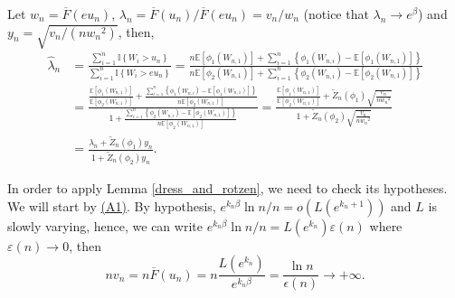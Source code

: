\documentclass[sn-mathphys-ay]{sn-jnl}%
\newcommand{\E}{\mathbb{E}}
\newcommand{\AssumpAOneText}{(A1)}
\newcommand{\AssumpAOne}{\hyperref[assumpt:AssumpAOne]{\AssumpAOneText}}
\begin{document}
\begin{appendices}
Let \(w_n=\overline F \left( {e{u_n}} \right)\), \({\lambda _n} = {{\overline F
        \left( {{u_n}} \right)}}/{{\overline F \left( {e{u_n}} \right)}}={v_n}/{w_n}\)
(notice that \(\lambda_n\to e^\beta\)) and \({y_n} = \sqrt
{{{{v_n}}}/{{(n{w_n}^2)}}}\), then,
\begin{align}
    \widehat{\lambda}_n & =\frac{{\sum\limits_{i = 1}^n {\mathbb{I}\left\{ {{W_i} > u_n} \right\}} }}{{\sum\limits_{i = 1}^n {\mathbb{I}\left\{ {{W_i} > eu_n} \right\}} }} = \frac{{n\E\left[{\phi_1}\left( {{W_{n,1}}} \right)\right] + \sum\limits_{i = 1}^n {\left\{ {{\phi _1}\left( {{W_{n,i}}} \right) - \E\left[{\phi _1}\left( {{W_{n,1}}} \right)\right]} \right\}} }}{{n\E\left[{\phi _2}\left( {{W_{n,1}}} \right)\right] + \sum\limits_{i = 1}^n {\left\{ {{\phi _2}\left( {{W_{n,i}}} \right) - \E\left[{\phi _2}\left( {{W_{n,1}}} \right)\right]} \right\}} }}\nonumber                                                                                                                                                                                                                                                                                                  \\
                        & = \frac{{\frac{{\E\left[{\phi _1}\left( {{W_{n,1}}} \right)\right]}}{{\E\left[{\phi _2}\left( {{W_{n,1}}} \right)\right]}} + \frac{{\sum\limits_{i = 1}^n {\left\{ {{\phi _1}\left( {{W_{n,i}}} \right) - \E\left[{\phi _1}\left( {{W_{n,1}}} \right)\right]} \right\}} }}{{n\E\left[{\phi _2}\left( {{W_{n,1}}} \right)\right]}}}}{{1 + \frac{{\sum\limits_{i = 1}^n {\left\{ {{\phi _2}\left( {{W_{n,i}}} \right) - \E\left[{\phi _2}\left( {{W_{n,1}}} \right)\right]} \right\}} }}{{n\E\left[{\phi _2}\left( {{W_{n,1}}} \right)\right]}}}} = \frac{{\frac{{\E\left[{\phi _1}\left( {{W_{n,1}}} \right)\right]}}{{\E\left[{\phi _2}\left( {{W_{n,1}}} \right)\right]}} + {{\widetilde Z}_n}\left( {{\phi _1}} \right)\sqrt {\frac{{{v_n}}}{{n{w_n}^2}}} }}{{1 + {{\widetilde Z}_n}\left( {{\phi _2}} \right)\sqrt {\frac{{{v_n}}}{{n{w_n}^2}}} }}\nonumber \\
                        & = \frac{{{\lambda _n} + {{\widetilde Z}_n}\left( {{\phi _1}} \right){y_n}}}{{1 + {{\widetilde Z}_n}\left( {{\phi _2}} \right){y_n}}}. \label{lamda_n}
\end{align}

In order to apply Lemma \ref{dress_and_rotzen}, we need to check its hypotheses. We
will start by \AssumpAOne. By hypothesis,
\(e^{k_n\beta}{\ln{n}}/{n}=o\left(L\left(e^{k_n+1}\right)\right)\) and \(L\) is
slowly varying, hence, we can write \({e^{{k_n}\beta }}{{\ln n}}/{n} = L\left(
{{e^{{k_n}}}} \right)\varepsilon \left( n \right)\) where \(\varepsilon \left( n
\right)\to 0\), then
\begin{equation*}
    nv_n=n\overline F ( {{u_n}} )=n\frac{L(e^{k_n})}{e^{k_n\beta}}=\frac{\ln n}{\epsilon(n)}\to +\infty.
\end{equation*}


\end{appendices}
\end{document}
